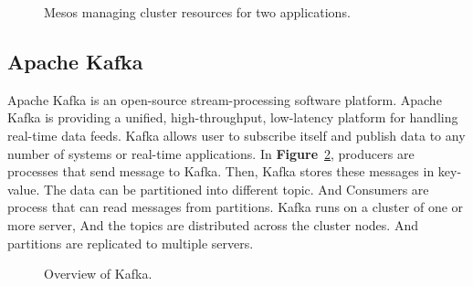 \documentclass[12pt,oneside,openright,a4paper]{cpe-english-project}
\begin{document}
\begin{figure}[!h]\centering
\setlength{\fboxrule}{0mm} %
\setlength{\fboxsep}{0cm}
\caption{Mesos managing cluster resources for two applications. \cite{mesosInAction}}\label{fig:spark}
\end{figure}

\newpage
\subsection{Apache Kafka}
Apache Kafka is an open-source stream-processing software platform. Apache Kafka is providing a unified, high-throughput, low-latency platform for handling real-time data feeds. Kafka allows user to subscribe itself and publish data to any number of systems or real-time applications. In \textbf{Figure}~\ref{fig:kafka}, producers are processes that send message to Kafka. Then, Kafka stores these messages in key-value. The data can be partitioned into different topic. And Consumers are process that can read messages from partitions. Kafka runs on a cluster of one or more server, And the topics are distributed across the cluster nodes. And partitions are replicated to multiple servers.\cite{kafka}

\begin{figure}[!h]\centering
\setlength{\fboxrule}{0mm} %
\setlength{\fboxsep}{0cm}
\caption{Overview of Kafka. \cite{kafka}}\label{fig:kafka}
\end{figure}
\end{document}
